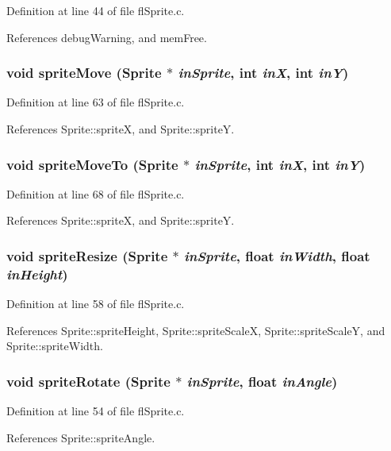 Definition at line 44 of file fl\-Sprite.c.

References debug\-Warning, and mem\-Free.
\subsubsection{\setlength{\rightskip}{0pt plus 5cm}void sprite\-Move ({\bf Sprite} $\ast$ {\em in\-Sprite}, int {\em in\-X}, int {\em in\-Y})}\label{flSprite_8h_d56cc0d4d9b2984ee0a06f12c1da3263}




Definition at line 63 of file fl\-Sprite.c.

References Sprite::sprite\-X, and Sprite::sprite\-Y.
\subsubsection{\setlength{\rightskip}{0pt plus 5cm}void sprite\-Move\-To ({\bf Sprite} $\ast$ {\em in\-Sprite}, int {\em in\-X}, int {\em in\-Y})}\label{flSprite_8h_c8da86cb58ec719832b10d5185197901}




Definition at line 68 of file fl\-Sprite.c.

References Sprite::sprite\-X, and Sprite::sprite\-Y.
\subsubsection{\setlength{\rightskip}{0pt plus 5cm}void sprite\-Resize ({\bf Sprite} $\ast$ {\em in\-Sprite}, float {\em in\-Width}, float {\em in\-Height})}\label{flSprite_8h_e695b7e4c94be550370faae21d704f51}




Definition at line 58 of file fl\-Sprite.c.

References Sprite::sprite\-Height, Sprite::sprite\-Scale\-X, Sprite::sprite\-Scale\-Y, and Sprite::sprite\-Width.
\subsubsection{\setlength{\rightskip}{0pt plus 5cm}void sprite\-Rotate ({\bf Sprite} $\ast$ {\em in\-Sprite}, float {\em in\-Angle})}\label{flSprite_8h_a03f96fb85bdc642a43418313e9eb466}




Definition at line 54 of file fl\-Sprite.c.

References Sprite::sprite\-Angle.